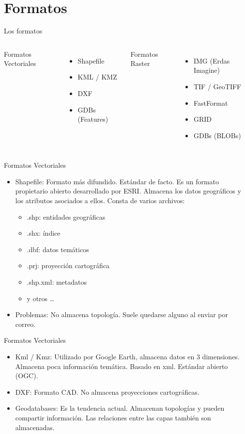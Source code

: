 \documentclass{beamer}
\begin{document}
\section{Formatos}

\begin{frame}{Los formatos}
	\begin{columns}[t]
			Formatos Vectoriales
			\begin{itemize}
				\item Shapefile 
				\item KML / KMZ 
				\item DXF
				\item GDBs (Features)
			\end{itemize}
			Formatos Raster
			\begin{itemize}
				\item IMG (Erdas Imagine)
				\item TIF / GeoTIFF
				\item FastFormat
				\item GRID
				\item GDBs (BLOBs)
			\end{itemize}
	\end{columns}
\end{frame}

\begin{frame}{Formatos Vectoriales}
	\begin{itemize}[<+->]
		\item Shapefile: Formato más difundido. Estándar de facto. Es un formato propietario abierto desarrollado por ESRI. Almacena los datos geográficos y los atributos asociados a ellos. Consta de varios archivos:
		\begin{itemize}
			\item .shp: entidades geográficas
			\item .shx: índice
			\item .dbf: datos temáticos
			\item .prj: proyección cartográfica
			\item .shp.xml: metadatos
			\item y otros \ldots
		\end{itemize}
		\item Problemas: No almacena topología. Suele quedarse alguno al enviar por correo.
	\end{itemize}
\end{frame}

\begin{frame}{Formatos Vectoriales}
	\begin{itemize}[<+->]
		\item Kml / Kmz: Utilizado por Google Earth, almacena datos en 3 dimensiones. Almacena poca información temática. Basado en xml. Estándar abierto (OGC). 
		\item DXF: Formato CAD. No almacena proyecciones cartográficas.
		\item Geodatabases: Es la tendencia actual. Almacenan topologías y pueden compartir información. Las relaciones entre las capas también son almacenadas.
	\end{itemize}
\end{frame}
\end{document}
